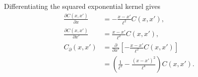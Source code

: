 \documentclass[11pt,letterpaper]{article}
\begin{document}

Differentiating the squared exponential kernel gives
\begin{align*}
  \frac{\partial C(x,x')}{\partial x}
   & =-\frac{x-x'}{\ell^2}
  C(x,x'),                                                        \\
  \frac{\partial C(x,x')}{\partial x'}
   & =\frac{x-x'}{\ell^2}C(x,x'),                                 \\
  C_{\partial}(x,x')
   & =\frac{\partial}{\partial x'}
  \left[-\frac{x-x'}{\ell^2}C(x,x')\right]                        \\
   & =\left(\frac1{\ell^2}-\frac{(x-x')^2}{\ell^4}\right)C(x,x').
\end{align*}
\end{document}
